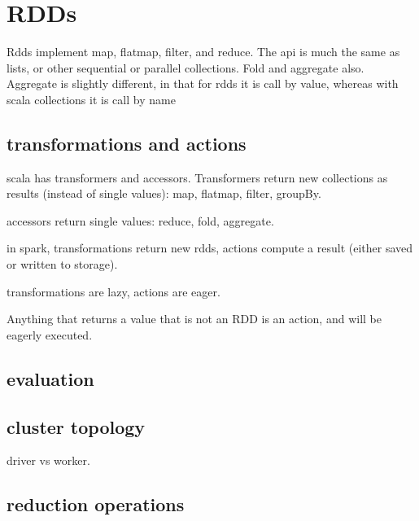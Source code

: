 \section{RDDs}

Rdds implement map, flatmap, filter, and reduce. The api is much the same as lists, or other sequential or parallel collections. Fold and aggregate also. Aggregate is slightly different, in that for rdds it is call by value, whereas with scala collections it is call by name 

\subsection{transformations and actions}

scala has transformers and accessors. Transformers return new collections as results (instead of single values): map, flatmap, filter, groupBy.

accessors return single values: reduce, fold, aggregate.

in spark, transformations return new rdds, actions compute a result (either saved or written to storage).

transformations are lazy, actions are eager.

Anything that returns a value that is not an RDD is an action, and will be eagerly executed.

\subsection{evaluation}

\subsection{cluster topology}

driver vs worker.

\subsection{reduction operations}


